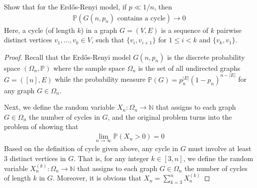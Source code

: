 \begin{problem}
  Show that for the Erdős-Renyi model, if $p \ll 1/n$, then
  \begin{align*}
    \mathbb{P}(G(n, p_{n}) \text{ contains a cycle}) \to 0
  \end{align*}
  Here, a cycle (of length $k$) in a graph $G=(V,E)$ is a sequence of $k$ pairwise distinct vertices $v_{1}, \ldots, v_{k} \in V$, such that $\{v_{i}, v_{i+1}\}$ for $1 \leq i < k$ and $\{v_{k},v_{1}\}$.
\end{problem}
\begin{proof}
  Recall that the Erdős-Renyi model $G(n, p_{n})$ is the discrete probability space $(\Omega_{n}, \mathbb{P})$ where the sample space $\Omega_{n}$ is the set of all undirected graphs $G = ([n], E)$ while the probability measure $\mathbb{P}(G) = p_{n}^{|E|} (1 - p_{n})^{n - |E|}$ for any graph $G \in \Omega_{n}$. 

  Next, we define the random variable $X_{n} : \Omega_{n} \to \mathbb{N}$ that assigns to each graph $G \in \Omega_{n}$ the number of cycles in $G$, and the original problem turns into the problem of showing that
  \begin{align*}
    \lim\limits_{n \to \infty} \mathbb{P}(X_{n} > 0) = 0
  \end{align*}
  Based on the definition of cycle given above, any cycle in $G$ must involve at least $3$ distinct vertices in $G$. That is, for any integer $k \in [3,n]$, we define the random variable $X_{n}^{(k)} : \Omega_{n} \to \mathbb{N}$ that assigns to each graph $G \in \Omega_{n}$ the number of cycles of length $k$ in $G$. Moreover, it is obvious that $X_{n} = \sum\limits_{k = 3}^{n} X_{n}^{(k)}$


\end{proof}
